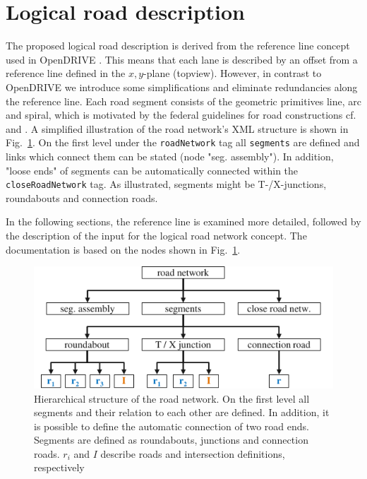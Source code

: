 \documentclass[a4paper, 10pt, conference]{ieeeconf}      %
\begin{document}
\section{Logical road description}
The proposed logical road description is derived from the reference line concept used in OpenDRIVE \cite{odr1.5}. This means that each lane is described by an offset from a reference line defined in the $x,y$-plane (topview). However, in contrast to OpenDRIVE we introduce some simplifications and eliminate redundancies along the reference line. Each road segment consists of the geometric primitives line, arc and spiral, which is motivated by the federal guidelines for road constructions cf. \cite{Baier.2008} and \cite{StraenNRW.2019}. A simplified illustration of the road network's XML structure is shown in Fig.~\ref{fig_schema}. On the first level under the \texttt{roadNetwork} tag all \texttt{segments} are defined and links which connect them can be stated (node "seg. assembly"). In addition, "loose ends" of segments can be automatically connected within the \texttt{closeRoadNetwork} tag. As illustrated, segments might be T-/X-junctions, roundabouts and connection roads. 

In the following sections, the reference line is examined more detailed, followed by the description of the input for the logical road network concept. The documentation is based on the nodes shown in Fig.~\ref{fig_schema}. 
\begin{figure}[thpb] 		
	\centering
	\includegraphics{fig/schema.pdf}
	\caption{Hierarchical structure of the road network. On the first level all segments and their relation to each other are defined. In addition, it is possible to define the automatic connection of two road ends. Segments are defined as roundabouts, junctions and connection roads. $r_i$ and $I$ describe roads and intersection definitions, respectively}
	\label{fig_schema}
\end{figure}
\end{document}
